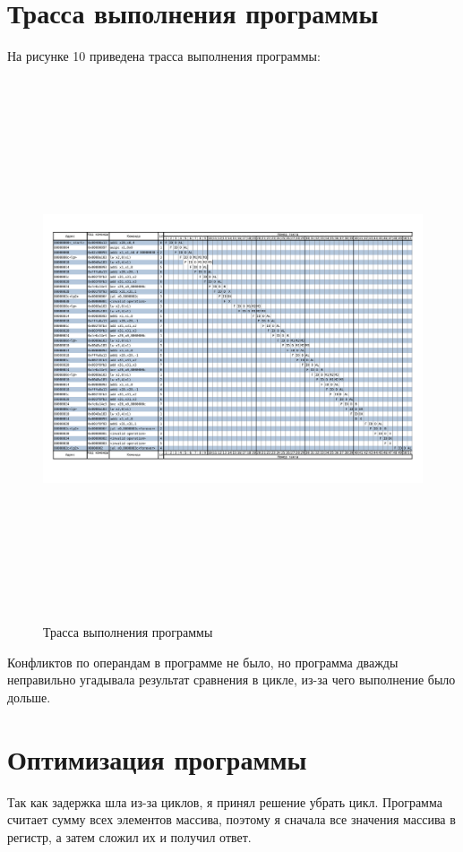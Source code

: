 \section*{Трасса выполнения программы}
На рисунке 10 приведена трасса выполнения программы:
\FloatBarrier
\begin{figure}[h]
	\begin{center}
		\includegraphics[width=\linewidth, height=16cm]{inc/my_ex.pdf}
	\end{center}
	\caption{Трасса выполнения программы}
\end{figure}
\FloatBarrier

Конфликтов по операндам в программе не было, но программа дважды неправильно угадывала результат сравнения в цикле, из-за чего выполнение было дольше.

\section*{Оптимизация программы}
Так как задержка шла из-за циклов, я принял решение убрать цикл.
Программа считает сумму всех элементов массива, поэтому я сначала все значения массива в регистр, а затем сложил их и получил ответ.

